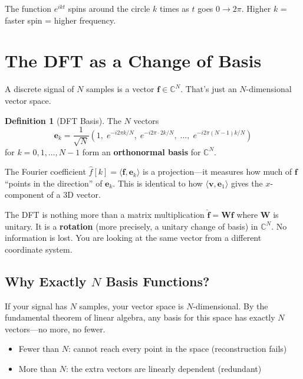 \documentclass[11pt,a4paper]{article}
\theoremstyle{definition}
\newtheorem{definition}{Definition}[section]
\begin{document}
The function $e^{ikt}$ spins around the circle $k$ times as $t$ goes $0 \to 2\pi$. Higher $k$ = faster spin = higher frequency.

\section{The DFT as a Change of Basis}

A discrete signal of $N$ samples is a vector $\mathbf{f} \in \mathbb{C}^N$. That's just an $N$-dimensional vector space.

\begin{definition}[DFT Basis]
The $N$ vectors
\begin{equation}
    \mathbf{e}_k = \frac{1}{\sqrt{N}} \left(1, \; e^{-i2\pi k/N}, \; e^{-i2\pi \cdot 2k/N}, \; \ldots, \; e^{-i2\pi(N-1)k/N}\right)
\end{equation}
for $k = 0, 1, \ldots, N-1$ form an \textbf{orthonormal basis} for $\mathbb{C}^N$.
\end{definition}

The Fourier coefficient $\hat{f}[k] = \langle \mathbf{f}, \mathbf{e}_k \rangle$ is a projection---it measures how much of $\mathbf{f}$ ``points in the direction'' of $\mathbf{e}_k$. This is identical to how $\langle \mathbf{v}, \mathbf{e}_1 \rangle$ gives the $x$-component of a 3D vector.

\begin{insight}
The DFT is nothing more than a matrix multiplication $\hat{\mathbf{f}} = \mathbf{W}\mathbf{f}$ where $\mathbf{W}$ is unitary. It is a \textbf{rotation} (more precisely, a unitary change of basis) in $\mathbb{C}^N$. No information is lost. You are looking at the same vector from a different coordinate system.
\end{insight}

\subsection{Why Exactly $N$ Basis Functions?}

If your signal has $N$ samples, your vector space is $N$-dimensional. By the fundamental theorem of linear algebra, any basis for this space has exactly $N$ vectors---no more, no fewer.
\begin{itemize}
    \item Fewer than $N$: cannot reach every point in the space (reconstruction fails)
    \item More than $N$: the extra vectors are linearly dependent (redundant)
\end{itemize}
\end{document}
